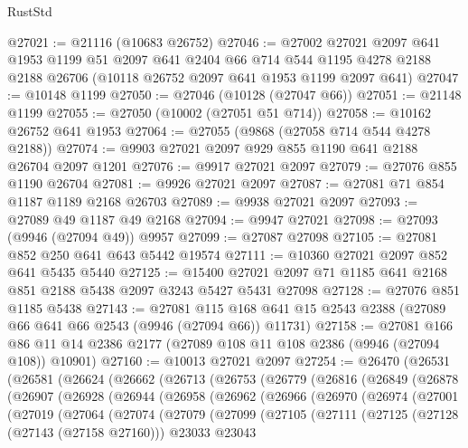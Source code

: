 \begin{lexlean}{RustStd}
\begin{coremodule}
@27021 := @21116 (@10683 @26752)
@27046 := @27002
    @27021
    @2097
    @641
    @1953
    @1199
    @51
    @2097
    @641
    @2404
    @66
    @714
    @544
    @1195
    @4278
    @2188
    @2188
    @26706
    (@10118 @26752 @2097 @641 @1953 @1199 @2097 @641)
@27047 := @10148 @1199
@27050 := @27046 (@10128 (@27047 @66))
@27051 := @21148 @1199
@27055 := @27050 (@10002 (@27051 @51 @714))
@27058 := @10162 @26752 @641 @1953
@27064 := @27055 (@9868 (@27058 @714 @544 @4278 @2188))
@27074 := @9903 @27021 @2097 @929 @855 @1190 @641 @2188 @26704 @2097 @1201
@27076 := @9917 @27021 @2097
@27079 := @27076 @855 @1190 @26704
@27081 := @9926 @27021 @2097
@27087 := @27081 @71 @854 @1187 @1189 @2168 @26703
@27089 := @9938 @27021 @2097
@27093 := @27089 @49 @1187 @49 @2168
@27094 := @9947 @27021
@27098 := @27093 (@9946 (@27094 @49)) @9957
@27099 := @27087 @27098
@27105 := @27081 @852 @250 @641 @643 @5442 @19574
@27111 := @10360 @27021 @2097 @852 @641 @5435 @5440
@27125 := @15400 @27021 @2097 @71 @1185 @641 @2168 @851 @2188 @5438 @2097 @3243 @5427 @5431 @27098
@27128 := @27076 @851 @1185 @5438
@27143 := @27081
    @115
    @168
    @641
    @15
    @2543
    @2388
    (@27089 @66 @641 @66 @2543 (@9946 (@27094 @66)) @11731)
@27158 := @27081
    @166
    @86
    @11
    @14
    @2386
    @2177
    (@27089 @108 @11 @108 @2386 (@9946 (@27094 @108)) @10901)
@27160 := @10013 @27021 @2097
@27254 := @26470
    (@26531
      (@26581
        (@26624
          (@26662
            (@26713
              (@26753
                (@26779
                  (@26816
                    (@26849
                      (@26878
                        (@26907
                          (@26928
                            (@26944
                              (@26958
                                (@26962
                                  (@26966
                                    (@26970
                                      (@26974
                                        (@27001
                                          (@27019
                                            (@27064
                                              (@27074
                                                (@27079
                                                  (@27099
                                                    (@27105
                                                      (@27111
                                                        (@27125
                                                          (@27128 (@27143 (@27158 @27160)))
                                                          @23033
                                                          @23043

\end{coremodule}
\end{lexlean}
